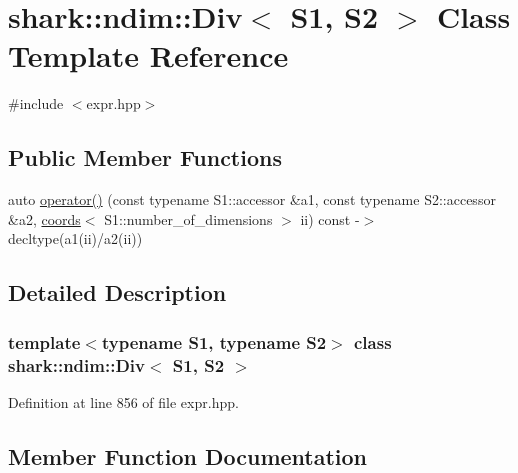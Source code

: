 \hypertarget{classshark_1_1ndim_1_1_div}{}\section{shark\+:\+:ndim\+:\+:Div$<$ S1, S2 $>$ Class Template Reference}
\label{classshark_1_1ndim_1_1_div}


{\ttfamily \#include $<$expr.\+hpp$>$}

\subsection*{Public Member Functions}
\begin{DoxyCompactItemize}
\item 
auto \hyperlink{classshark_1_1ndim_1_1_div_ab5535da75926a49c440718ec50bfaa33}{operator()} (const typename S1\+::accessor \&a1, const typename S2\+::accessor \&a2, \hyperlink{structshark_1_1ndim_1_1coords}{coords}$<$ S1\+::number\+\_\+of\+\_\+dimensions $>$ ii) const -\/$>$ decltype(a1(ii)/a2(ii))
\end{DoxyCompactItemize}


\subsection{Detailed Description}
\subsubsection*{template$<$typename S1, typename S2$>$\newline
class shark\+::ndim\+::\+Div$<$ S1, S2 $>$}



Definition at line 856 of file expr.\+hpp.



\subsection{Member Function Documentation}
\hypertarget{classshark_1_1ndim_1_1_div_ab5535da75926a49c440718ec50bfaa33}{}\label{classshark_1_1ndim_1_1_div_ab5535da75926a49c440718ec50bfaa33} 
